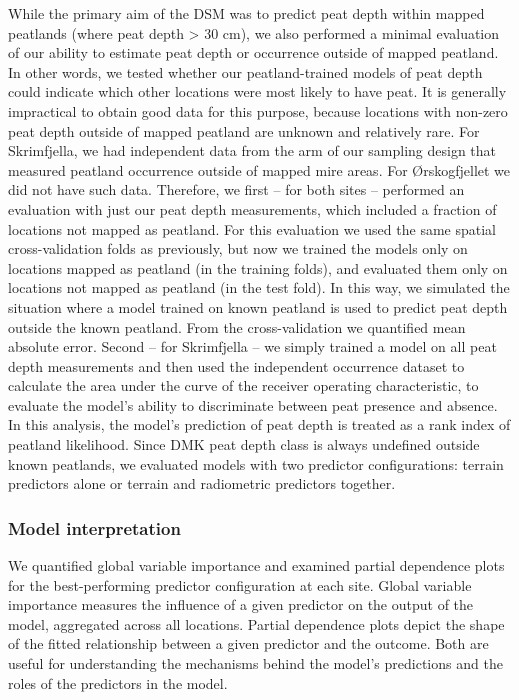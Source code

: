 \documentclass[soil, manuscript]{copernicus}
\begin{document}
While the primary aim of the DSM was to predict peat depth within mapped peatlands (where peat depth \textgreater{} 30 cm), we also performed a minimal evaluation of our ability to estimate peat depth or occurrence outside of mapped peatland.
In other words, we tested whether our peatland-trained models of peat depth could indicate which other locations were most likely to have peat.
It is generally impractical to obtain good data for this purpose, because locations with non-zero peat depth outside of mapped peatland are unknown and relatively rare.
For Skrimfjella, we had independent data from the arm of our sampling design that measured peatland occurrence outside of mapped mire areas.
For Ørskogfjellet we did not have such data.
Therefore, we first -- for both sites -- performed an evaluation with just our peat depth measurements, which included a fraction of locations not mapped as peatland.
For this evaluation we used the same spatial cross-validation folds as previously, but now we trained the models only on locations mapped as peatland (in the training folds), and evaluated them only on locations not mapped as peatland (in the test fold).
In this way, we simulated the situation where a model trained on known peatland is used to predict peat depth outside the known peatland.
From the cross-validation we quantified mean absolute error.
Second -- for Skrimfjella -- we simply trained a model on all peat depth measurements and then used the independent occurrence dataset to calculate the area under the curve of the receiver operating characteristic, to evaluate the model's ability to discriminate between peat presence and absence.
In this analysis, the model's prediction of peat depth is treated as a rank index of peatland likelihood.
Since DMK peat depth class is always undefined outside known peatlands, we evaluated models with two predictor configurations: terrain predictors alone or terrain and radiometric predictors together.

\subsubsection{Model interpretation}

We quantified global variable importance and examined partial dependence plots for the best-performing predictor configuration at each site.
Global variable importance measures the influence of a given predictor on the output of the model, aggregated across all locations.
Partial dependence plots depict the shape of the fitted relationship between a given predictor and the outcome.
Both are useful for understanding the mechanisms behind the model's predictions and the roles of the predictors in the model.
\end{document}
